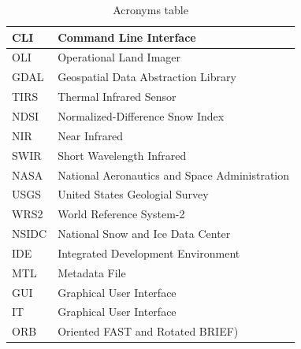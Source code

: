 \documentclass[12pt, a4paper]{report}
\begin{document}
	\begin{table} [H]
		\centering
		\begin{tabular} {|  l | L{10cm} |}
		\hline
		CLI & Command Line Interface \\ [0.2ex]
		\hline
		OLI & Operational Land Imager \\ [0.2ex]
		\hline
		GDAL & Geospatial Data Abstraction Library \\ [0.2ex]
		\hline
		TIRS & Thermal Infrared Sensor \\ [0.2ex]
		\hline 
		NDSI & Normalized-Difference Snow Index \\ [0.2ex]
		\hline
		NIR & Near Infrared \\ [0.2ex]
		\hline
		SWIR & Short Wavelength Infrared  \\ [0.2ex]
		\hline 
		NASA & National Aeronautics and Space Administration  \\ [0.2ex]
		\hline
		USGS & United States Geologial Survey  \\ [0.2ex]
		\hline
		WRS2 & World Reference System-2  \\ [0.2ex]
		\hline
		NSIDC & National Snow and Ice Data Center \\ [0.2ex]
		\hline
		IDE & Integrated Development Environment  \\ [0.2ex]
		\hline
		MTL & Metadata File \\ [0.2ex]
		\hline
		GUI & Graphical User Interface \\ [0.2ex]
		\hline
		IT & Graphical User Interface \\ [0.2ex]
		\hline
		ORB & Oriented FAST and Rotated BRIEF)\\ [0.2ex]
		\hline
		\end{tabular}
		\caption{Acronyms table }
		\label{table:acron}
	\end{table}
	
	
\end{document}
